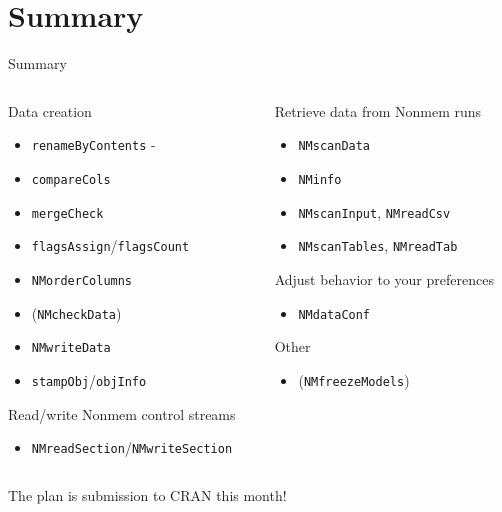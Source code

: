 \documentclass[
  8pt,
  ignorenonframetext,
  aspectratio=169]{beamer}
\providecommand{\tightlist}{%
  \setlength{\itemsep}{0pt}\setlength{\parskip}{0pt}}
\begin{document}
\hypertarget{summary}{%
\section{Summary}\label{summary}}

\begin{frame}[fragile]{Summary}
\begin{columns}[T]
\begin{column}{0.48\textwidth}
Data creation

\begin{itemize}
\tightlist
\item
  \texttt{renameByContents} -
\item
  \texttt{compareCols}
\item
  \texttt{mergeCheck}
\item
  \texttt{flagsAssign}/\texttt{flagsCount}
\item
  \texttt{NMorderColumns}
\item
  (\texttt{NMcheckData})
\item
  \texttt{NMwriteData}
\item
  \texttt{stampObj}/\texttt{objInfo}
\end{itemize}

Read/write Nonmem control streams

\begin{itemize}
\tightlist
\item
  \texttt{NMreadSection}/\texttt{NMwriteSection}
\end{itemize}
\end{column}

\begin{column}{0.48\textwidth}
Retrieve data from Nonmem runs

\begin{itemize}
\tightlist
\item
  \texttt{NMscanData}
\item
  \texttt{NMinfo}
\item
  \texttt{NMscanInput}, \texttt{NMreadCsv}
\item
  \texttt{NMscanTables}, \texttt{NMreadTab}
\end{itemize}

Adjust behavior to your preferences

\begin{itemize}
\tightlist
\item
  \texttt{NMdataConf}
\end{itemize}

Other

\begin{itemize}
\tightlist
\item
  (\texttt{NMfreezeModels})
\end{itemize}
\end{column}
\end{columns}

\begin{block}{The plan is submission to CRAN this month!}
\protect\hypertarget{the-plan-is-submission-to-cran-this-month}{}
\end{block}
\end{frame}
\end{document}
